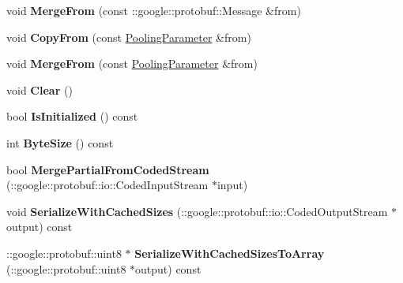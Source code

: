 \begin{DoxyCompactItemize}
void {\bfseries Merge\+From} (const \+::google\+::protobuf\+::\+Message \&from)
\item 
\mbox{\label{classcaffe_1_1_pooling_parameter_a48419e11585905cd81c394cbc6b5f068}} 
void {\bfseries Copy\+From} (const \mbox{\hyperlink{classcaffe_1_1_pooling_parameter}{Pooling\+Parameter}} \&from)
\item 
\mbox{\label{classcaffe_1_1_pooling_parameter_a429a2822edb48ae92dac89fc5fac5836}} 
void {\bfseries Merge\+From} (const \mbox{\hyperlink{classcaffe_1_1_pooling_parameter}{Pooling\+Parameter}} \&from)
\item 
\mbox{\label{classcaffe_1_1_pooling_parameter_a2a0ccbdbefb47a4ed8b0bc917fbb1f3c}} 
void {\bfseries Clear} ()
\item 
\mbox{\label{classcaffe_1_1_pooling_parameter_a0d1a61fb90d5919f2ba2a0154ef29789}} 
bool {\bfseries Is\+Initialized} () const
\item 
\mbox{\label{classcaffe_1_1_pooling_parameter_a0d06ef242063cc2b47d10379d74f2855}} 
int {\bfseries Byte\+Size} () const
\item 
\mbox{\label{classcaffe_1_1_pooling_parameter_a29a5686aa5141ac667851878cd047dd6}} 
bool {\bfseries Merge\+Partial\+From\+Coded\+Stream} (\+::google\+::protobuf\+::io\+::\+Coded\+Input\+Stream $\ast$input)
\item 
\mbox{\label{classcaffe_1_1_pooling_parameter_ad7e1ee2b9ccde355f14bf8cfb50b60bc}} 
void {\bfseries Serialize\+With\+Cached\+Sizes} (\+::google\+::protobuf\+::io\+::\+Coded\+Output\+Stream $\ast$output) const
\item 
\mbox{\label{classcaffe_1_1_pooling_parameter_accc0fca5e2400cd82b4133b3ff43df9e}} 
\+::google\+::protobuf\+::uint8 $\ast$ {\bfseries Serialize\+With\+Cached\+Sizes\+To\+Array} (\+::google\+::protobuf\+::uint8 $\ast$output) const
\item 
\mbox{\label{classcaffe_1_1_pooling_parameter_a17bd715af5b48e43d5163c03e1749375}} 

\end{DoxyCompactItemize}
